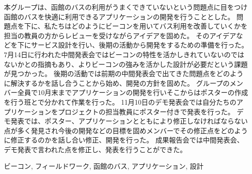 \documentclass[openany,11pt,papersize]{jsbook}
\begin{document}
  \maketitle

  \frontmatter

  \begin{jabstract}

  


本グループは、函館のバスの利用がうまくできていないという問題点に目をつけ函館のバスを快適に利用できるアプリケーションの開発を行うこととした。
問題点を下に、私たちはどのようにビーコンを用いてバス利用を改善していくかを担当の教員の方からレビューを受けながらアイデアを固めた。
そのアイデアなどを下にサービス設計を行い、後期の活動から開発をするための準備を行った。
7月14日に行われた中間発表会ではビーコンの特性を活かしきれていないのではないかとの指摘もあり、よりビーコンの強みを活かした設計が必要だという課題が見つかった。
後期の活動では前期の中間発表会で出てきた問題点をどのように解決するかを話し合うことから始め、開発の方針を固めた。
グループのメンバー全員で10月末までアプリケーションの開発を行いそこからはポスターの作成を行う班とで分かれて作業を行った。
11月10日のデモ発表会では自分たちのアプリケーションをプロジェクトの担当教員にポスター付きで発表を行った。
デモ発表では、ポスター、アプリケーションとともにより修正しなければならない点が多く発見され今後の開発などの目標を固めメンバーでその修正点をどのように修正するのかを話し合い修正、開発を行った。
成果報告会では中間発表会、デモ発表で言われた点を修正し、発表を行うことができた。

\begin{jkeyword}
ビーコン, フィールドワーク, 函館のバス, アプリケーション, 設計
\end{jkeyword}
\end{jabstract}
\end{document}
